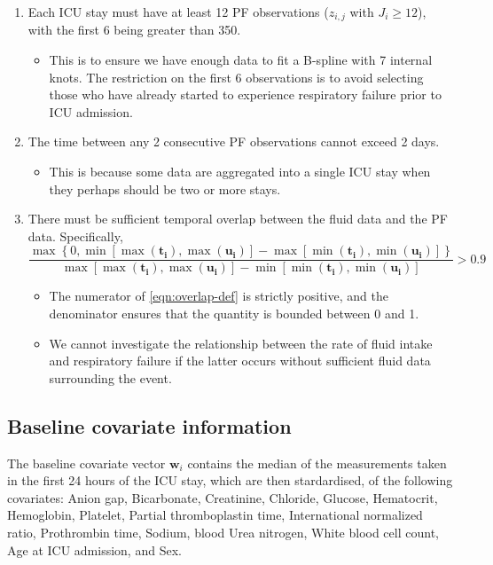\documentclass[
  10pt,
  a4paper,
]{article}
\providecommand{\tightlist}{%
  \setlength{\itemsep}{0pt}\setlength{\parskip}{0pt}}
\begin{document}
\begin{enumerate}
\def\labelenumi{\arabic{enumi}.}
\tightlist
\item
  Each ICU stay must have at least 12 PF observations (\(z_{i, j}\) with
  \(J_{i} \geq 12\)), with the first 6 being greater than 350.

  \begin{itemize}
  \tightlist
  \item
    This is to ensure we have enough data to fit a B-spline with 7
    internal knots. The restriction on the first 6 observations is to
    avoid selecting those who have already started to experience
    respiratory failure prior to ICU admission.
  \end{itemize}
\item
  The time between any 2 consecutive PF observations cannot exceed 2
  days.

  \begin{itemize}
  \tightlist
  \item
    This is because some data are aggregated into a single ICU stay when
    they perhaps should be two or more stays.
  \end{itemize}
\item
  There must be sufficient temporal overlap between the fluid data and
  the PF data. Specifically, \begin{equation}
   \frac{
     \max\left\{0, \min\left[\max(\boldsymbol{t_{i}}), \max(\boldsymbol{u_{i}})\right] - \max\left[\min(\boldsymbol{t_{i}}), \min(\boldsymbol{u_{i}})\right]\right\}
   } {
     \max\left[\max(\boldsymbol{t_{i}}), \max(\boldsymbol{u_{i}})\right] - \min\left[\min(\boldsymbol{t_{i}}), \min(\boldsymbol{u_{i}})\right]
   }
   > 0.9
   \label{eqn:overlap-def}
    \end{equation}

  \begin{itemize}
  \tightlist
  \item
    The numerator of \eqref{eqn:overlap-def} is strictly positive, and
    the denominator ensures that the quantity is bounded between 0 and
    1.
  \item
    We cannot investigate the relationship between the rate of fluid
    intake and respiratory failure if the latter occurs without
    sufficient fluid data surrounding the event.
  \end{itemize}
\end{enumerate}

\hypertarget{baseline-covariate-information}{%
\subsection{Baseline covariate
information}\label{baseline-covariate-information}}

The baseline covariate vector \(\boldsymbol{w}_{i}\) contains the median
of the measurements taken in the first 24 hours of the ICU stay, which
are then stardardised, of the following covariates: Anion gap,
Bicarbonate, Creatinine, Chloride, Glucose, Hematocrit, Hemoglobin,
Platelet, Partial thromboplastin time, International normalized ratio,
Prothrombin time, Sodium, blood Urea nitrogen, White blood cell count,
Age at ICU admission, and Sex.
\end{document}
